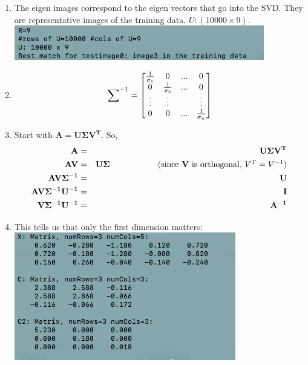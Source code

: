 \documentclass{article}
\newcommand\tab[1][1cm]{\hspace*{#1}}
\begin{document}
\begin{enumerate}
\item The eigen images correspond to the eigen vectors that go into the SVD. They are representative images of the training data. $U: (10000 \times 9)$. \\
\includegraphics[scale=0.6]{exercise14_1}

\item $$ {\bf \sum}^{-1} = 
	\begin{bmatrix} 
	\frac{1}{\sigma_1} & 0 & ... & 0 \\
	0 & \frac{1}{\sigma_2} & ... & 0 \\
	\vdots & \vdots & & \vdots \\
	0 & 0 & ... & \frac{1}{\sigma_n}
	\end{bmatrix}$$

\item Start with $\mathbf{A} = \mathbf{U\Sigma V^T}$. So, 
\begin{eqnarray*}
\mathbf{A} &=& \mathbf{U\Sigma V^T}\\
\mathbf{AV} &=& \mathbf{U\Sigma} \mbox{\tab\tab (since \textbf{V} is orthogonal, $V^T=V^{-1}$)}\\
\mathbf{AV\Sigma^{-1}} &=& \mathbf{U}\\
\mathbf{AV\Sigma^{-1}U^{-1}} &=& \mathbf{I}\\
\mathbf{V\Sigma^{-1}U^{-1}} &=& \mathbf{A^{-1}}
\end{eqnarray*}

\item This tells us that only the first dimension matters: \\
\includegraphics[scale=0.6]{exercise17}


\end{enumerate}
\end{document}
